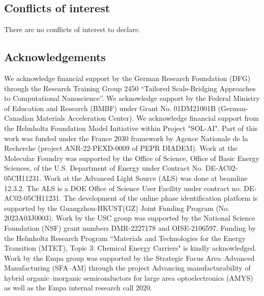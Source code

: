\documentclass[a4paper]{article}
\begin{document}
\subsection*{Conflicts of interest}
There are no conflicts of interest to declare.

\subsection*{Acknowledgements}
We acknowledge financial support by the German Research Foundation (DFG) through the Research Training Group 2450 “Tailored Scale-Bridging Approaches to Computational Nanoscience”. We acknowledge support by the Federal Ministry of Education and Research (BMBF) under Grant No. 01DM21001B (German-Canadian Materials Acceleration Center). We acknowledge financial support from the Helmholtz Foundation Model Initiative within Project "SOL-AI". Part of this work was funded under the France 2030 framework by Agence Nationale de la Recherche (project ANR-22-PEXD-0009 of PEPR DIADEM). Work at the Molecular Foundry was supported by the Office of Science, Office of Basic Energy Sciences, of the U.S. Department of Energy under Contract No. DE-AC02-05CH11231. Work at the Advanced Light Source (ALS) was done at beamline 12.3.2. The ALS is a DOE Office of Science User Facility under contract no. DE-AC02-05CH11231. The development of the online phase identification platform is supported by the Guangzhou-HKUST(GZ) Joint Funding Program (No. 2023A03J0003). Work by the USC group was supported by the National Science Foundation (NSF) grant numbers DMR-2227178 and OISE-2106597. Funding by the Helmholtz Research Program “Materials and Technologies for the Energy Transition (MTET), Topic 3: Chemical Energy Carriers" is kindly acknowledged. Work by the Empa group was supported by the Strategic Focus Area–Advanced Manufacturing (SFA–AM) through the project Advancing manufacturability of hybrid organic–inorganic semiconductors for large area optoelectronics (AMYS) as well as the Empa internal research call 2020.

\printnomenclature




\setcounter{section}{0}
\renewcommand{\thesection}{S\arabic{section}}
\setcounter{figure}{0}
\renewcommand{\thefigure}{S\arabic{figure}}
\setcounter{table}{0}
\renewcommand{\thetable}{S\arabic{table}}
\end{document}
